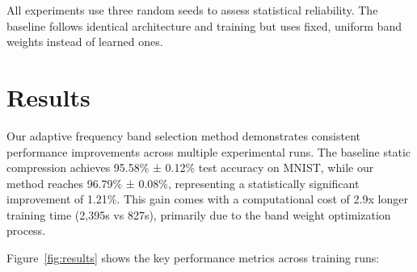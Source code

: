 \documentclass{article} %
\begin{document}
All experiments use three random seeds to assess statistical reliability. The baseline follows identical architecture and training but uses fixed, uniform band weights instead of learned ones.

\section{Results}
\label{sec:results}

Our adaptive frequency band selection method demonstrates consistent performance improvements across multiple experimental runs. The baseline static compression achieves 95.58\% ± 0.12\% test accuracy on MNIST, while our method reaches 96.79\% ± 0.08\%, representing a statistically significant improvement of 1.21\%. This gain comes with a computational cost of 2.9x longer training time (2,395s vs 827s), primarily due to the band weight optimization process.

Figure~\ref{fig:results} shows the key performance metrics across training runs:
\end{document}
